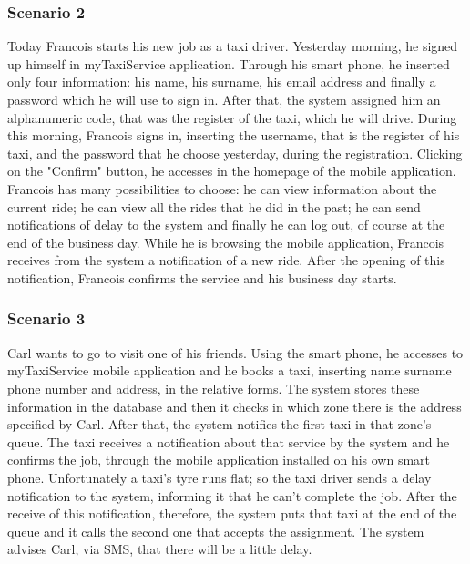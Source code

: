 		\subsubsection{Scenario 2}
		Today Francois starts his new job as a taxi driver. Yesterday morning, he signed up himself in myTaxiService application. Through his smart phone, he inserted only four information: his name, his surname, his email address and finally a password which he will use to sign in. After that, the system assigned him an alphanumeric code, that was the register of the taxi, which he will drive.
		During this morning, Francois signs in, inserting the username, that is the register of his taxi, and the password that he choose yesterday, during the registration. Clicking on the "Confirm" button, he accesses in the homepage of the mobile application. Francois has many possibilities to choose: he can view information about the current ride; he can view all the rides that he did in the past; he can send notifications of delay to the system and finally he can log out, of course at the end of the business day.
		While he is browsing the mobile application, Francois receives from the system a notification of a new ride. After the opening of this notification, Francois confirms the service and his business day starts.  
		
		\subsubsection{Scenario 3}
		Carl wants to go to visit one of his friends. Using the smart phone, he accesses to myTaxiService mobile application and he books a taxi, inserting name surname phone number and address, in the relative forms. The system stores these information in the database and then it checks in which zone there is the address specified by Carl. After that, the system notifies the first taxi in that zone's queue. The taxi receives a notification about that service by the system and he confirms the job, through the mobile application installed on his own smart phone. 
		Unfortunately a taxi's tyre runs flat; so the taxi driver sends a delay notification to the system, informing it that he can't complete the job. After the receive of this notification, therefore, the system puts that taxi at the end of the queue and it calls the second one that accepts the assignment. The system advises Carl, via SMS, that there will be a little delay.
		
